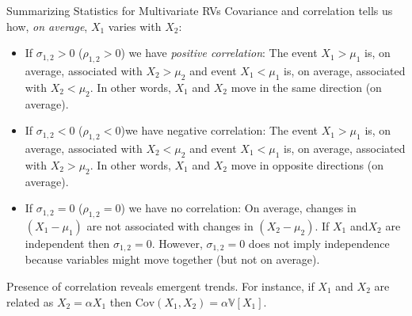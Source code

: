 \documentclass[9pt]{beamer}
\begin{document}
%
\begin{frame}{Summarizing Statistics for Multivariate RVs}
Covariance and correlation tells us how, {\em on average}, $X_1$ varies with $X_2$: 

\begin{block}{}
\begin{itemize}
\setlength{\itemsep}{10pt}
\item If $\sigma_{1,2}>0$ ($\rho_{1,2}>0$) we have {\em positive correlation}: The event $X_1>\mu_1$  is, on average, associated with $X_2>\mu_2$ and event $X_1<\mu_1$  is, on average, associated with $X_2<\mu_2$.  In other words, $X_1$ and $X_2$ move in the same direction (on average).

\item If $\sigma_{1,2}<0$  ($\rho_{1,2}<0$)we have negative correlation: The event $X_1>\mu_1$  is, on average, associated with $X_2<\mu_2$ and event $X_1<\mu_1$  is, on average, associated with $X_2>\mu_2$. In other words, $X_1$ and $X_2$ move in opposite directions (on average). 

\item If $\sigma_{1,2}=0$ ($\rho_{1,2}=0$) we have no correlation: On average, changes in $(X_1-\mu_1)$ are not associated with changes in $(X_2-\mu_2)$. If $X_1$ and$X_2$ are independent then $\sigma_{1,2}=0$. However, $\sigma_{1,2}=0$ does not imply independence because variables might move together (but not on average).
\end{itemize}
\end{block}
Presence of correlation reveals emergent trends. For instance, if $X_1$ and $X_2$ are related as $X_2=\alpha X_1$ then $\textrm{Cov}(X_1,X_2)=\alpha \mathbb{V}[X_1]$. 

\end{frame}
\end{document}

